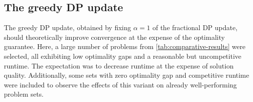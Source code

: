 
\subsection{The greedy DP update}
The greedy DP update, obtained by fixing \(\alpha=1\) of the fractional DP update, should theoretically improve convergence at the expense of the optimality guarantee.
Here, a large number of problems from \cref{tab:comparative-results} were selected, all exhibiting low optimality gaps and a reasonable but uncompetitive runtime.
The expectation was to decrease runtime at the expense of solution quality.
Additionally, some sets with zero optimality gap and competitive runtime were included to observe the effects of this variant on already well-performing problem sets.

